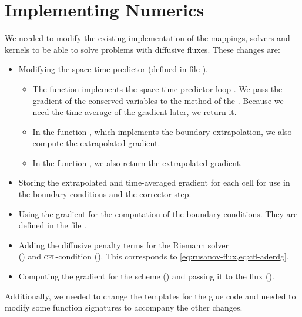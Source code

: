 \section{Implementing Numerics}
We needed to modify the existing implementation of the mappings, solvers and kernels to be able to solve problems with diffusive fluxes.
These changes are:
\begin{itemize}
\item Modifying the space-time-predictor (defined in file ).
  \begin{itemize}
  \item The function  implements the space-time-predictor loop .
    We pass the gradient of the conserved variables to the  method of the .
    Because we need the time-average of the gradient later, we return it.
   \item In the function , which implements the boundary extrapolation, we also compute the extrapolated gradient.
    \item In the function , we also return the extrapolated gradient.
  \end{itemize}
\item Storing the extrapolated and time-averaged gradient for each cell for use in the boundary conditions and the corrector step.
\item Using the gradient for the computation of the boundary conditions.
  They are defined in the file .
\item Adding the diffusive penalty terms for the Riemann solver\\() and \textsc{cfl}-condition ().
  This corresponds to \cref{eq:rusanov-flux,eq:cfl-aderdg}.
\item Computing the gradient for the \muscl{} scheme () and passing it to the flux ().
\end{itemize}
Additionally, we needed to change the templates for the glue code and needed to modify some function signatures to accompany the other changes.

